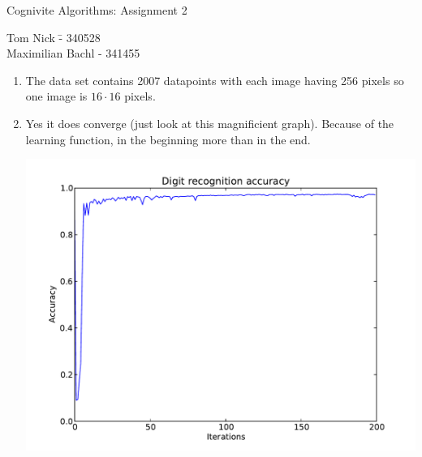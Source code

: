 \documentclass[a4paper,10pt]{article}
\begin{document}
\begin{center}
\Large{Cognivite Algorithms: Assignment 2} \\
\end{center}
\begin{tabbing}
Tom Nick \hspace{2cm}\= - 340528\\
Maximilian Bachl \> - 341455 \\
\end{tabbing}

\begin{enumerate}
    \item The data set contains 2007 datapoints with each image having 256 pixels so one image is $16\cdot16$ pixels.
    \item Yes it does converge (just look at this magnificient graph). Because of the learning function, in the beginning more than in the end. \\
          \begin{center}\includegraphics[scale=0.5]{./task_2_340528_341455.pdf}\end{center}

\end{enumerate}
\end{document}
